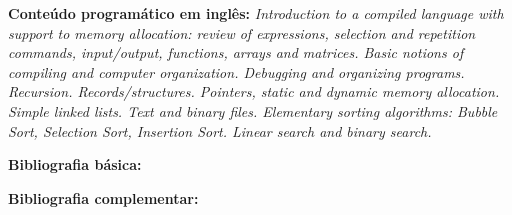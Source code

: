 \documentclass[class=article, crop=false]{standalone}
\begin{document}
\textbf{Conteúdo programático em inglês:}
\textit{Introduction to a compiled language with support to memory allocation:
review of expressions, selection and repetition commands, input/output,
functions, arrays and matrices.
Basic notions of compiling and computer organization.
Debugging and organizing programs.
Recursion.
Records/structures.
Pointers, static and dynamic memory allocation.
Simple linked lists.
Text and binary files.
Elementary sorting algorithms: Bubble Sort, Selection Sort, Insertion Sort.
Linear search and binary search.}

\newrefsection
\textbf{Bibliografia básica:}
\nocite{1998-sedgewick, 2017-celes-etal, 2012-backes}
\printbibliography

\newrefsection
\textbf{Bibliografia complementar:}
\nocite{2009-feofiloff,2007-ziviani,2010-szwarcfiter-markenzon,1995-tenenbaum-etal,1997-schildt}
\printbibliography
\end{document}
